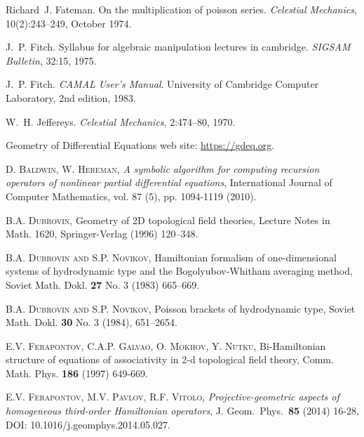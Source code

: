 \begin{thebibliography}{999}
Richard~J. Fateman.
\newblock On the multiplication of poisson series.
\newblock \emph{Celestial Mechanics}, 10(2):243--249, October 1974.

J.~P. Fitch.
\newblock Syllabus for algebraic manipulation lectures in cambridge.
\newblock \emph{SIGSAM Bulletin}, 32:15, 1975.

J.~P. Fitch.
\newblock \emph{{CAMAL} {User's} {Manual}}.
\newblock University of Cambridge Computer Laboratory, 2nd edition, 1983.

W.~H. Jeffereys.
\newblock \emph{Celestial Mechanics}, 2:474--80, 1970.


 Geometry of Differential Equations web site:
  \url{https://gdeq.org}.


 \textsc{D. Baldwin, W. Hereman}, \emph{A symbolic algorithm
    for computing recursion operators of nonlinear partial differential
    equations}, International Journal of Computer Mathematics, vol. 87 (5),
  pp. 1094-1119 (2010).

 \textsc{B.A. Dubrovin}, \newblock Geometry of 2D topological
field theories, Lecture Notes in Math. 1620, Springer-Verlag (1996) 120--348.

 \textsc{B.A. Dubrovin and S.P. Novikov}, \newblock Hamiltonian
  formalism of one-dimensional systems of hydrodynamic type and the
  Bogolyubov-Whitham averaging method, Soviet Math. Dokl. \textbf{27} No. 3
  (1983) 665--669.

 \textsc{B.A. Dubrovin and S.P. Novikov}, Poisson brackets of
  hydrodynamic type, Soviet Math. Dokl. \textbf{30} No. 3 (1984), 651--2654.

 \textsc{E.V. Ferapontov, C.A.P. Galvao, O. Mokhov, Y. Nutku},
  Bi-Hamiltonian structure of equations of associativity in 2-d
  topological field theory, Comm. Math. Phys. \textbf{186 }(1997) 649-669.

 \textsc{E.V. Ferapontov, M.V. Pavlov, R.F. Vitolo},
\emph{Projective-geometric aspects of homogeneous third-order Hamiltonian
operators}, J. Geom.\ Phys.\ \textbf{85} (2014) 16-28, DOI:
10.1016/j.geomphys.2014.05.027.


\end{thebibliography}
